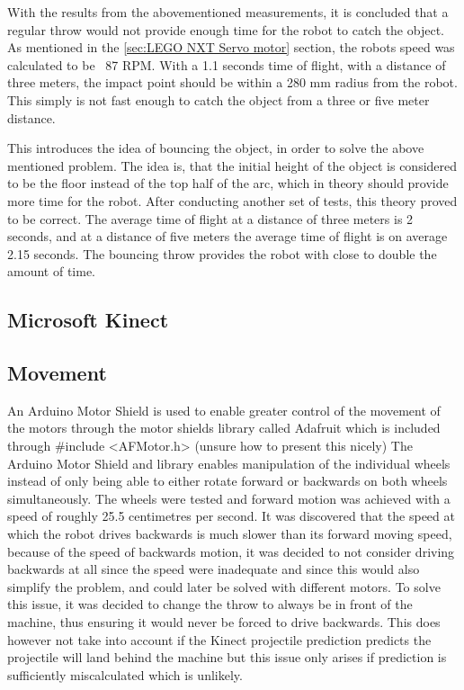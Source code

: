 With the results from the abovementioned measurements, it is concluded that a regular throw would not provide enough time for the robot to catch the object. As mentioned in the \ref{sec:LEGO NXT Servo motor} section, the robots speed was calculated to be ~87 RPM. With a 1.1 seconds time of flight, with a distance of three meters, the impact point should be within a 280 mm radius from the robot. This simply is not fast enough to catch the object from a three or five meter distance.

This introduces the idea of bouncing the object, in order to solve the above mentioned problem. The idea is, that the initial height of the object is considered to be the floor instead of the top half of the arc, which in theory should provide more time for the robot. \newline
After conducting another set of tests, this theory proved to be correct. The average time of flight at a distance of three meters is 2 seconds, and at a distance of five meters the average time of flight is on average 2.15 seconds. The bouncing throw provides the robot with close to double the amount of time.

\subsection{Microsoft Kinect}
\label{sec:i1Microsoft KinectImplementation}

\subsection{Movement}
\label{sec:i1MovementImplementation}
An Arduino Motor Shield is used to enable greater control of the movement of the motors through the motor shields library called Adafruit which is included through \#include <AFMotor.h> (unsure how to present this nicely)
The Arduino Motor Shield and library enables manipulation of the individual wheels instead of only being able to either rotate forward or backwards on both wheels simultaneously. 
The wheels were tested and forward motion was achieved with a speed of roughly 25.5 centimetres per second. It was discovered that the speed at which the robot drives backwards is much slower than its forward moving speed, because of the speed of backwards motion, it was decided to not consider driving backwards at all since the speed were inadequate and since this would also simplify the problem, and could later be solved with different motors. To solve this issue, it was decided to change the throw to always be in front of the machine, thus ensuring it would never be forced to drive backwards. This does however not take into account if the Kinect projectile prediction predicts the projectile will land behind the machine but this issue only arises if prediction is sufficiently miscalculated which is unlikely.

